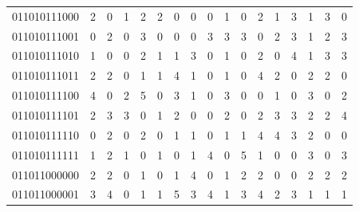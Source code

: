 \documentclass[10pt,a4paper]{article}
\begin{document}
\begin{longtable}{ |c|c|c|c|c|c|c|c|c|c|c|c|c|c|c|c|c| }
    011010111000              & 2                            & 0                                & 1                            & 2                              & 2   & 0   & 0   & 0   & 1   & 0   & 2   & 1   & 3   & 1   & 3   & 0   \\
    011010111001              & 0                            & 2                                & 0                            & 3                              & 0   & 0   & 0   & 3   & 3   & 3   & 0   & 2   & 3   & 1   & 2   & 3   \\
    011010111010              & 1                            & 0                                & 0                            & 2                              & 1   & 1   & 3   & 0   & 1   & 0   & 2   & 0   & 4   & 1   & 3   & 3   \\
    011010111011              & 2                            & 2                                & 0                            & 1                              & 1   & 4   & 1   & 0   & 1   & 0   & 4   & 2   & 0   & 2   & 2   & 0   \\
    011010111100              & 4                            & 0                                & 2                            & 5                              & 0   & 3   & 1   & 0   & 3   & 0   & 0   & 1   & 0   & 3   & 0   & 2   \\
    011010111101              & 2                            & 3                                & 3                            & 0                              & 1   & 2   & 0   & 0   & 2   & 0   & 2   & 3   & 3   & 2   & 2   & 4   \\
    011010111110              & 0                            & 2                                & 0                            & 2                              & 0   & 1   & 1   & 0   & 1   & 1   & 4   & 4   & 3   & 2   & 0   & 0   \\
    011010111111              & 1                            & 2                                & 1                            & 0                              & 1   & 0   & 1   & 4   & 0   & 5   & 1   & 0   & 0   & 3   & 0   & 3   \\
    011011000000              & 2                            & 2                                & 0                            & 1                              & 0   & 1   & 4   & 0   & 1   & 2   & 2   & 0   & 0   & 2   & 2   & 2   \\
    011011000001              & 3                            & 4                                & 0                            & 1                              & 1   & 5   & 3   & 4   & 1   & 3   & 4   & 2   & 3   & 1   & 1   & 1   \\

\end{longtable}
\end{document}
